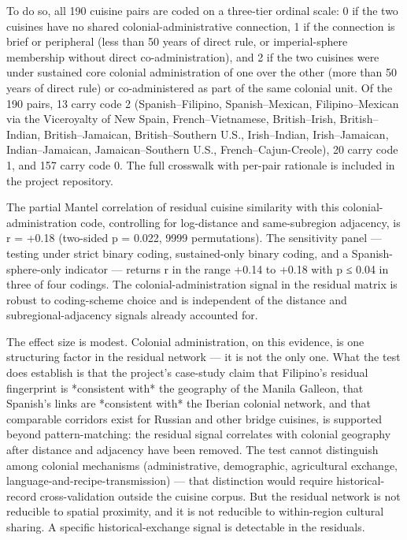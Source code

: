 \documentclass[11pt]{article}
\begin{document}
To do so, all 190 cuisine pairs are coded on a three-tier ordinal scale: 0 if the two cuisines have no shared colonial-administrative connection, 1 if the connection is brief or peripheral (less than 50 years of direct rule, or imperial-sphere membership without direct co-administration), and 2 if the two cuisines were under sustained core colonial administration of one over the other (more than 50 years of direct rule) or co-administered as part of the same colonial unit. Of the 190 pairs, 13 carry code 2 (Spanish–Filipino, Spanish–Mexican, Filipino–Mexican via the Viceroyalty of New Spain, French–Vietnamese, British–Irish, British–Indian, British–Jamaican, British–Southern U.S., Irish–Indian, Irish–Jamaican, Indian–Jamaican, Jamaican–Southern U.S., French–Cajun-Creole), 20 carry code 1, and 157 carry code 0. The full crosswalk with per-pair rationale is included in the project repository.


The partial Mantel correlation of residual cuisine similarity with this colonial-administration code, controlling for log-distance and same-subregion adjacency, is r = +0.18 (two-sided p = 0.022, 9999 permutations). The sensitivity panel — testing under strict binary coding, sustained-only binary coding, and a Spanish-sphere-only indicator — returns r in the range +0.14 to +0.18 with p ≤ 0.04 in three of four codings. The colonial-administration signal in the residual matrix is robust to coding-scheme choice and is independent of the distance and subregional-adjacency signals already accounted for.


The effect size is modest. Colonial administration, on this evidence, is one structuring factor in the residual network — it is not the only one. What the test does establish is that the project's case-study claim that Filipino's residual fingerprint is *consistent with* the geography of the Manila Galleon, that Spanish's links are *consistent with* the Iberian colonial network, and that comparable corridors exist for Russian and other bridge cuisines, is supported beyond pattern-matching: the residual signal correlates with colonial geography after distance and adjacency have been removed. The test cannot distinguish among colonial mechanisms (administrative, demographic, agricultural exchange, language-and-recipe-transmission) — that distinction would require historical-record cross-validation outside the cuisine corpus. But the residual network is not reducible to spatial proximity, and it is not reducible to within-region cultural sharing. A specific historical-exchange signal is detectable in the residuals.
\end{document}

